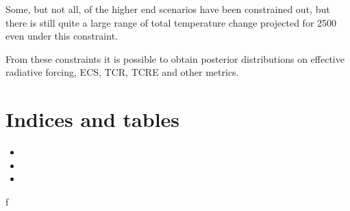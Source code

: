 \documentclass[letterpaper,10pt,english]{sphinxmanual}
\begin{document}
\noindent{}

Some, but not all, of the higher end scenarios have been constrained
out, but there is still quite a large range of total temperature change
projected for 2500 even under this constraint.

From these constraints it is possible to obtain posterior distributions
on effective radiative forcing, ECS, TCR, TCRE and other metrics.
\label{\detokenize{index:module-fair}}

\chapter{Indices and tables}
\label{\detokenize{index:indices-and-tables}}\begin{itemize}
\item {} 

\item {} 

\item {} 

\end{itemize}


\renewcommand{\indexname}{Python Module Index}
\begin{sphinxtheindex}
\def\bigletter#1{{\Large\sffamily#1}\nopagebreak\vspace{1mm}}
\bigletter{f}
\item {}
\end{sphinxtheindex}

\renewcommand{\indexname}{Index}
\printindex
\end{document}
